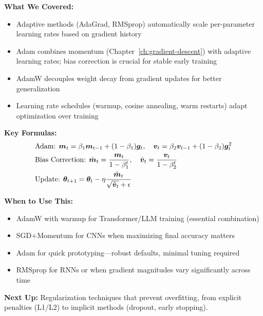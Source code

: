 \documentclass[../../main.tex]{subfiles}
\begin{document}
\begin{chaptersummary}
\textbf{What We Covered:}
\begin{itemize}
    \item Adaptive methods (AdaGrad, RMSprop) automatically scale per-parameter learning rates based on gradient history
    \item Adam combines momentum (Chapter~\ref{ch:gradient-descent}) with adaptive learning rates; bias correction is crucial for stable early training
    \item AdamW decouples weight decay from gradient updates for better generalization
    \item Learning rate schedules (warmup, cosine annealing, warm restarts) adapt optimization over training
\end{itemize}

\textbf{Key Formulas:}
\begin{align*}
    &\text{Adam: } \boldsymbol{m}_t = \beta_1 \boldsymbol{m}_{t-1} + (1-\beta_1)\boldsymbol{g}_t, \quad \boldsymbol{v}_t = \beta_2 \boldsymbol{v}_{t-1} + (1-\beta_2)\boldsymbol{g}_t^2 \\
    &\text{Bias Correction: } \hat{\boldsymbol{m}}_t = \frac{\boldsymbol{m}_t}{1-\beta_1^t}, \quad \hat{\boldsymbol{v}}_t = \frac{\boldsymbol{v}_t}{1-\beta_2^t} \\
    &\text{Update: } \boldsymbol{\theta}_{t+1} = \boldsymbol{\theta}_t - \eta \frac{\hat{\boldsymbol{m}}_t}{\sqrt{\hat{\boldsymbol{v}}_t} + \epsilon}
\end{align*}

\textbf{When to Use This:}
\begin{itemize}
    \item AdamW with warmup for Transformer/LLM training (essential combination)
    \item SGD+Momentum for CNNs when maximizing final accuracy matters
    \item Adam for quick prototyping---robust defaults, minimal tuning required
    \item RMSprop for RNNs or when gradient magnitudes vary significantly across time
\end{itemize}

\textbf{Next Up:} Regularization techniques that prevent overfitting, from explicit penalties (L1/L2) to implicit methods (dropout, early stopping).
\end{chaptersummary}
\end{document}
